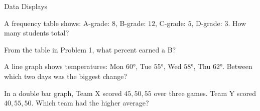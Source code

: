 \begin{practiceBox}{Data Displays}
\resetProblems

\prob A frequency table shows: A-grade: $8$, B-grade: $12$, C-grade: $5$, D-grade: $3$. How many students total?

\prob From the table in Problem 1, what percent earned a B?

\prob A line graph shows temperatures: Mon $60°$, Tue $55°$, Wed $58°$, Thu $62°$. Between which two days was the biggest change?

\prob In a double bar graph, Team X scored $45, 50, 55$ over three games. Team Y scored $40, 55, 50$. Which team had the higher average?


\end{practiceBox}
